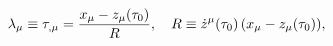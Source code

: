 \begin{equation}
\lambda_{\mu} \equiv \tau_{,\mu}={x_{\mu}-z_{\mu}(\tau_{0}) \over R}, ~~~
R \equiv  \dot{z}^{\mu}(\tau_{0})\,(x_{\mu}-z_{\mu}(\tau_{0})),
\label{lam}
\end{equation}

